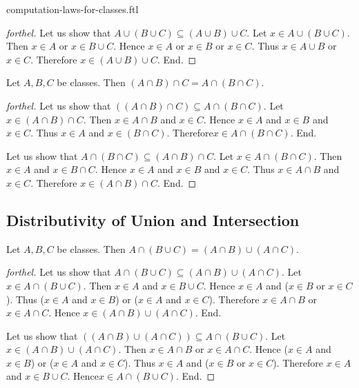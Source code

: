 \documentclass{naproche-library}
\begin{document}
\begin{smodule}{computation-laws-for-classes.ftl}
\begin{proof}[forthel]
    Let us show that $A \cup (B \cup C) \subseteq (A \cup B) \cup C$.
      Let $x \in A \cup (B \cup C)$.
      Then $x \in A$ or $x \in B \cup C$.
      Hence $x \in A$ or $x \in B$ or $x \in C$.
      Thus $x \in A \cup B$ or $x \in C$.
      Therefore $x \in (A \cup B) \cup C$.
    End.
  \end{proof}

  \begin{proposition}[forthel,id=FOUNDATIONS_02_906751977193472,printid]
    Let $A, B, C$ be classes.
    Then $(A \cap B) \cap C = A \cap (B \cap C)$.
  \end{proposition}
  \begin{proof}[forthel]
    Let us show that $((A \cap B) \cap C) \subseteq A \cap (B \cap C)$. %
      Let $x \in (A \cap B) \cap C$.
      Then $x \in A \cap B$ and $x \in C$.
      Hence $x \in A$ and $x \in B$ and $x \in C$.
      Thus $x \in A$ and $x \in (B \cap C)$.
      Therefore$ x \in A \cap (B \cap C)$.
    End.

    Let us show that $A \cap (B \cap C) \subseteq (A \cap B) \cap C$.
      Let $x \in A \cap (B \cap C)$.
      Then $x \in A$ and $x \in B \cap C$.
      Hence $x \in A$ and $x \in B$ and $x \in C$.
      Thus $x \in A \cap B$ and $x \in C$.
      Therefore $x \in (A \cap B) \cap C$.
    End.
  \end{proof}


  \subsection*{Distributivity of Union and Intersection}

  \begin{proposition}[forthel,id=FOUNDATIONS_02_371139087958016,printid]
    Let $A, B, C$ be classes.
    Then $A \cap (B \cup C) = (A \cap B) \cup (A \cap C)$.
  \end{proposition}
  \begin{proof}[forthel]
    Let us show that $A \cap (B \cup C) \subseteq (A \cap B) \cup (A \cap C)$.
      Let $x \in A \cap (B \cup C)$.
      Then $x \in A$ and $x \in B \cup C$.
      Hence $x \in A$ and ($x \in B$ or $x \in C$).
      Thus ($x \in A$ and $x \in B$) or ($x \in A$ and $x \in C$).
      Therefore $x \in A \cap B$ or $x \in A \cap C$.
      Hence $x \in (A \cap B) \cup (A \cap C)$.
    End.

    Let us show that $((A \cap B) \cup (A \cap C)) \subseteq A \cap (B \cup C)$. %
      Let $x \in (A \cap B) \cup (A \cap C)$.
      Then $x \in A \cap B$ or $x \in A \cap C$.
      Hence ($x \in A$ and $x \in B$) or ($x \in A$ and $x \in C$).
      Thus $x \in A$ and ($x \in B$ or $x \in C$).
      Therefore $x \in A$ and $x \in B \cup C$.
      Hence$ x \in A \cap (B \cup C)$.
    End.
  \end{proof}


\end{smodule}
\end{document}
